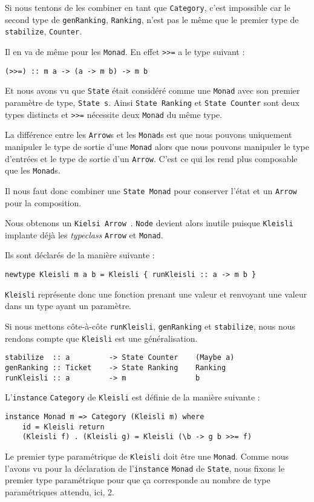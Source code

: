 \documentclass{llncs}
\newcommand{\Arr}{\lstinline{Arrow} }
\newcommand{\Arrp}{\lstinline{Arrow}. }
\newcommand{\Arrs}{\lstinline{Arrow}s }
\begin{document}
Si nous tentons de les combiner en tant que \lstinline{Category}, c'est impossible
car le second type de \lstinline{genRanking}, \lstinline{Ranking}, n'est pas le
même que le premier type de \lstinline{stabilize}, \lstinline{Counter}.

Il en va de même pour les \lstinline{Monad}.
En effet \lstinline{>>=} a le type suivant :
\begin{lstlisting}
(>>=) :: m a -> (a -> m b) -> m b
\end{lstlisting}

Et nous avons vu que \lstinline{State} était considéré comme une \lstinline{Monad}
avec son premier paramètre de type, \lstinline{State s}.
Ainsi \lstinline{State Ranking} et \lstinline{State Counter} sont deux types distincts
et \lstinline{>>=} nécessite deux \lstinline{Monad} du même type.

La différence entre les \Arrs et les \lstinline{Monad}s est que nous pouvons
uniquement manipuler le type de sortie d'une \lstinline{Monad} alors que nous pouvons
manipuler le type d'entrées et le type de sortie d'un \Arrp
C'est ce qui les rend plus composable que les \lstinline{Monad}s.

Il nous faut donc combiner une \lstinline{State Monad} pour conserver l'état et un
\lstinline{Arrow} pour la composition.

Nous obtenons un \lstinline{Kielsi Arrow}~\cite{Hughes00}.
\lstinline{Node} devient alors inutile puisque \lstinline{Kleisli} implante déjà les
\emph{typeclass} \Arr et \lstinline{Monad}.

Ils sont déclarés de la manière suivante :
\begin{lstlisting}
newtype Kleisli m a b = Kleisli { runKleisli :: a -> m b }
\end{lstlisting}

\lstinline{Kleisli} représente donc une fonction prenant une valeur et renvoyant
une valeur dans un type ayant un paramètre.

Si nous mettons côte-à-côte \lstinline{runKleisli}, \lstinline{genRanking} et
\lstinline{stabilize}, nous nous rendons compte que \lstinline{Kleisli} est une
généralisation.
\begin{lstlisting}
stabilize  :: a         -> State Counter    (Maybe a)
genRanking :: Ticket    -> State Ranking    Ranking
runKleisli :: a         -> m                b
\end{lstlisting}

L'\lstinline{instance} \lstinline{Category} de \lstinline{Kleisli} est
définie de la manière suivante :
\begin{lstlisting}
instance Monad m => Category (Kleisli m) where
    id = Kleisli return
    (Kleisli f) . (Kleisli g) = Kleisli (\b -> g b >>= f)
\end{lstlisting}
Le premier type paramétrique de \lstinline{Kleisli} doit être une \lstinline{Monad}.
Comme nous l'avons vu pour la déclaration de l'\lstinline{instance} \lstinline{Monad}
de \lstinline{State}, nous fixons le premier type paramétrique pour que ça corresponde
au nombre de type paramétriques attendu, ici, 2.
\end{document}
